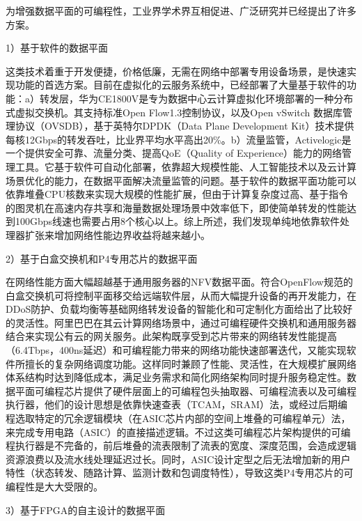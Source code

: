
为增强数据平面的可编程性，工业界学术界互相促进、广泛研究并已经提出了许多方案。

1）基于软件的数据平面

这类技术着重于开发便捷，价格低廉，无需在网络中部署专用设备场景，是快速实现功能的首选方案。目前在虚拟化的云服务系统中，已经部署了大量基于软件的功能：a）转发层，华为CE1800V是专为数据中心云计算虚拟化环境部署的一种分布式虚拟交换机。其支持标准Open Flow1.3控制协议，以及Open vSwitch 数据库管理协议（OVSDB），基于英特尔DPDK（Data Plane Development Kit）技术提供每核12Gbps的转发吞吐，比业界平均水平高出20\%。b）流量监管，Activelogic是一个提供安全可靠、流量分类、提高QoE（Quality of Experience）能力的网络管理工具。它基于软件可自动化部署，依靠超大规模性能、人工智能技术以及云计算场景优化的能力，在数据平面解决流量监管的问题。基于软件的数据平面功能可以依靠堆叠CPU核数来实现大规模的性能扩展，但由于计算复杂度过高、基于指令的图灵机在高速内存共享和海量数据处理场景中效率低下，即使简单转发的性能达到100Gbps线速也需要占用8个核心以上。综上所述，我们发现单纯地依靠软件处理器扩张来增加网络性能边界收益将越来越小。

2）基于白盒交换机和P4专用芯片的数据平面

在网络性能方面大幅超越基于通用服务器的NFV数据平面。符合OpenFlow规范的白盒交换机可将控制平面移交给远端软件层，从而大幅提升设备的再开发能力，在DDoS防护、负载均衡等基础网络转发设备的智能化和可定制化方面给出了比较好的灵活性。阿里巴巴在其云计算网络场景中，通过可编程硬件交换机和通用服务器结合来实现公有云的网关服务。此架构既享受到芯片带来的网络转发性能提高（6.4Tbps，400ns延迟）和可编程能力带来的网络功能快速部署迭代，又能实现软件所擅长的复杂网络调度功能。这样同时兼顾了性能、灵活性，在大规模扩展网络体系结构时达到降低成本，满足业务需求和简化网络架构同时提升服务稳定性。数据平面可编程芯片提供了硬件层面上的可编程包头抽取器、可编程流表以及可编程执行器，他们的设计思想是依靠快速查表（TCAM，SRAM）法，或经过后期编程选取特定的冗余逻辑模块（在ASIC芯片内部的空间上堆叠的可编程单元）法，来完成专用电路（ASIC）的直接描述逻辑。不过这类可编程芯片架构提供的可编程执行器是不完备的，前后堆叠的流表限制了流表的宽度、深度范围，会造成逻辑资源浪费以及流水线处理延迟过长。同时，ASIC设计定型之后无法增加新的用户特性（状态转发、随路计算、监测计数和包调度特性），导致这类P4专用芯片的可编程性是大大受限的。

3）基于FPGA的自主设计的数据平面

